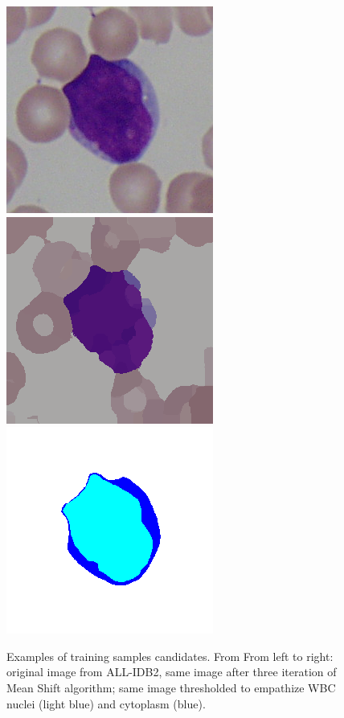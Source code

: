 \documentclass[final,a4paper,12pt,english]{UnicaPhdThesis3}
\begin{document}
\begin{figure}[!b]
	\centering
	\includegraphics[height=0.10\textheight]{images/2015_2_iciap/Im002_1}
	\includegraphics[height=0.10\textheight]{images/2015_2_iciap/Im002_1_MS}
	\includegraphics[height=0.10\textheight]{images/2015_2_iciap/Im002_1_T}
	\caption{\label{fig:svm_candidates} Examples of training samples candidates. From From left to right: original image from ALL-IDB2, same image after three iteration of Mean Shift algorithm; same image thresholded to empathize WBC nuclei (light blue) and cytoplasm (blue).}
\end{figure}
\end{document}
